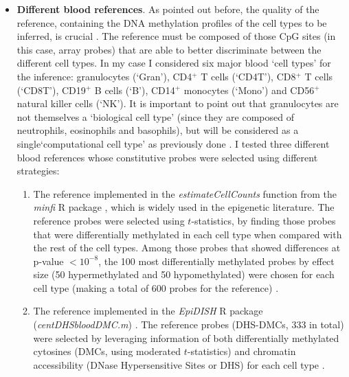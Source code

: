\begin{itemize}
	
	\item \textbf{Different blood references}. As pointed out before, the quality of the reference, containing the DNA methylation profiles of the cell types to be inferred, is crucial \cite{Teschendorff2017a,Koestler2016}. The reference must be composed of those CpG sites (in this case, array probes) that are able to better discriminate between the different cell types. In my case I considered six major blood `cell types' for the inference: granulocytes (`\acrshort{Gran}'), CD4$^+$ T cells (`\acrshort{CD4T}'), CD8$^+$ T cells (`\acrshort{CD8T}'), CD19$^+$ B cells (`\acrshort{B}'), CD14$^+$ monocytes (`\acrshort{Mono}') and  CD56$^+$ natural killer cells (`\acrshort{NK}'). It is important to point out that granulocytes are not themselves a `biological cell type' (since they are composed of neutrophils, eosinophils and basophils), but will be considered as a single`computational cell type' as previously done \cite{Horvath2016, Chen2016}. I tested three different blood references whose constitutive probes were selected using different strategies:
	
	\begin{enumerate}
		
		\item The reference implemented in the \textit{estimateCellCounts} function from the \textit{minfi} R package \cite{Aryee2014}, which is widely used in the epigenetic literature. The reference probes were selected using $t$-statistics, by finding those probes that were differentially methylated in each cell type when compared with the rest of the cell types. Among those probes that showed differences at p-value $< 10^{-8}$, the 100 most differentially methylated probes by effect size (50 hypermethylated and 50 hypomethylated) were chosen for each cell type (making a total of 600 probes for the reference) \cite{Jaffe2014}. 
		
		\smallskip
		
		\item The reference implemented in the \textit{EpiDISH} R package (\textit{centDHSbloodDMC.m}) \cite{Teschendorff2017b}. The reference probes (\acrshort{DHS-DMCs}, 333 in total) were selected by leveraging information of both differentially methylated cytosines (\acrshort{DMCs}, using moderated $t$-statistics) and chromatin accessibility (DNase Hypersensitive Sites or \acrshort{DHS}) for each cell type \cite{Teschendorff2017a}.  
		

\end{enumerate}
\end{itemize}
